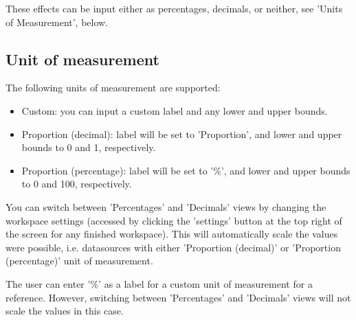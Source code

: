 \documentclass[00_mcda_tutorial.tex]{subfiles}
\begin{document}
\noindent These effects can be input either as percentages, decimals, or neither, see 'Units of Measurement', below.

\subsection*{Unit of measurement}
\label{sec:uom}
The following units of measurement are supported:
\begin{itemize}
    \item Custom: you can input a custom label and any lower and upper bounds.
    \item Proportion (decimal): label will be set to 'Proportion', and lower and upper bounds to 0 and 1, respectively.
    \item Proportion (percentage): label will be set to '\%', and lower and upper bounds to 0 and 100, respectively.
\end{itemize}

\noindent You can switch between 'Percentages' and 'Decimals' views by changing the workspace settings (accessed by clicking the 'settings' button at the top right of the screen for any finished workspace). This will automatically scale the values were possible, i.e. datasources with either 'Proportion (decimal)' or 'Proportion (percentage)' unit of measurement.
\newline

\noindent The user can enter '\%' as a label for a custom unit of measurement for a reference. However, switching between 'Percentages' and 'Decimals' views will not scale the values in this case.
\end{document}
